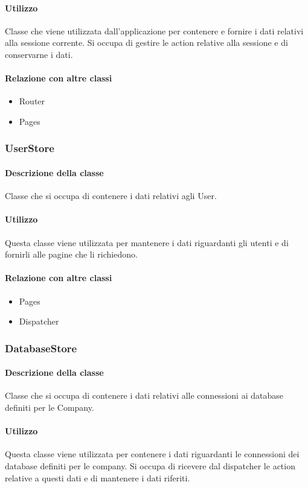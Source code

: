 \paragraph*{Utilizzo}
Classe che viene utilizzata dall'applicazione per contenere e fornire i dati relativi alla sessione corrente. Si occupa di gestire le action relative alla sessione e di conservarne i dati.
\paragraph*{Relazione con altre classi}
\begin{itemize}
\item Router
\item Pages
\end{itemize}

\subsubsection{UserStore}
\paragraph*{Descrizione della classe}
Classe che si occupa di contenere i dati relativi agli User.
\paragraph*{Utilizzo}
Questa classe viene utilizzata per mantenere i dati riguardanti gli utenti e di fornirli alle pagine che li richiedono.
\paragraph*{Relazione con altre classi}
\begin{itemize}
\item Pages
\item Dispatcher
\end{itemize}

\subsubsection{DatabaseStore}
\paragraph*{Descrizione della classe}
Classe che si occupa di contenere i dati relativi alle connessioni ai database definiti per le Company.
\paragraph*{Utilizzo}
Questa classe viene utilizzata per contenere i dati riguardanti le connessioni dei database definiti per le company. Si occupa di ricevere dal dispatcher le action relative a questi dati e di mantenere i dati riferiti.
